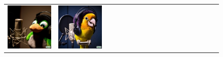 \begin{figure}[ht!]
\begin{adjustwidth}{-0.8in}{-0.5in}
\begin{tabular}{cccccccccccccccccccc}
\multicolumn{2}{c}{\includegraphics[width=\threebythreecolwidth\textwidth]{figures/cherries/bird_sing8.jpg}} &
\multicolumn{2}{c}{\includegraphics[width=\threebythreecolwidth\textwidth]{figures/cherries/bird_sing9.jpg}} &&

\end{tabular}
\end{adjustwidth}
\end{figure}
